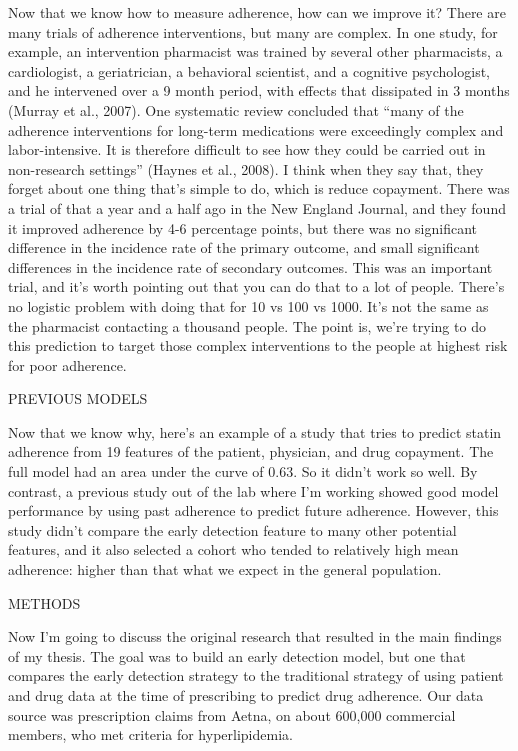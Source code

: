 \documentclass[12pt]{report}
\begin{document}
\begin{large}
Now that we know how to measure adherence, how can we improve it?
There are many trials of adherence interventions, but many are
complex. In one study, for example, an intervention pharmacist was
trained by several other pharmacists, a cardiologist, a geriatrician,
a behavioral scientist, and a cognitive psychologist, and he
intervened over a 9 month period, with effects that dissipated in 3
months (Murray et al., 2007). One systematic review concluded that
``many of the adherence interventions for long-term medications were
exceedingly complex and labor-intensive. It is therefore difficult to
see how they could be carried out in non-research settings'' (Haynes et
al., 2008). I think when they say that, they forget about one thing
that's simple to do, which is reduce copayment. There was a trial of
that a year and a half ago in the New England Journal, and they found
it improved adherence by 4-6 percentage points, but there was no
significant difference in the incidence rate of the primary outcome,
and small significant differences in the incidence rate of secondary
outcomes. This was an important trial, and it's worth pointing out
that you can do that to a lot of people. There's no logistic problem
with doing that for 10 vs 100 vs 1000. It's not the same as the
pharmacist contacting a thousand people. The point is, we're trying to
do this prediction to target those complex interventions to the people
at highest risk for poor adherence. 

PREVIOUS MODELS

Now that we know why, here's an example of a study that tries to
predict statin adherence from 19 features of the patient, physician,
and drug copayment. The full model had an area under the curve of
0.63. So it didn't work so well. By contrast, a previous study out of
the lab where I'm working showed good model performance by using past
adherence to predict future adherence. However, this study didn't
compare the early detection feature to many other potential features,
and it also selected a cohort who tended to relatively high mean
adherence: higher than that what we expect in the general population.

METHODS

Now I'm going to discuss the original research that resulted in the
main findings of my thesis. The goal was to build an early detection
model, but one that compares the early detection strategy to the
traditional strategy of using patient and drug data at the time of
prescribing to predict drug adherence. Our data source was
prescription claims from Aetna, on about 600,000 commercial members,
who met criteria for hyperlipidemia.


\end{large}
\end{document}
